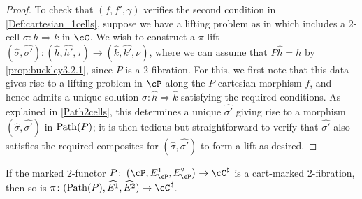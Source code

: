 \documentclass[11pt, dvipsnames]{amsart}
\begin{document}
\begin{proof}
	To check that $(f,f',\gamma)$ verifies the second condition in \cref{Def:cartesian_1cells}, suppose we have a lifting problem as in  which includes a 2-cell $\sigma\colon h\Rightarrow k$ in $\cC$. We wish to construct a $\pi$-lift $(\widehat{\sigma},\widehat{\sigma'})\colon (\widehat{h},\widehat{h'}, \tau)\to (\widehat{k},\widehat{k'}, \nu)$, where we can assume that $P\widehat{h}=h$ by \cref{prop:buckley3.2.1}, since $P$ is a 2-fibration. For this, we first note that this data gives rise to a lifting problem in $\cP$ along the $P$-cartesian morphism $f$, and hence admits a unique solution $\widehat{\sigma}\colon\widehat{h}\Rightarrow\widehat{k}$ satisfying the required conditions. As explained in \cref{Path2cells}, this determines a unique $\widehat{\sigma'}$ giving rise to a morphism $(\widehat{\sigma},\widehat{\sigma'})$ in $\mathrm{Path}(P)$; it is then tedious but straightforward to verify that $\widehat{\sigma'}$ also satisfies the required composites for $(\widehat{\sigma},\widehat{\sigma'})$ to form a lift as desired.
\end{proof}



\begin{prop}\label{pathnaivefib}
     If the marked 2-functor $P\colon \markedscat{\cP} \to \cC^{\sharp}$ is a cart-marked 2-fibration, then so is $\pi\colon (\Path(P),\widehat{E^1},\widehat{E^2})\to\cC^{\sharp}$.
\end{prop}
\end{document}
